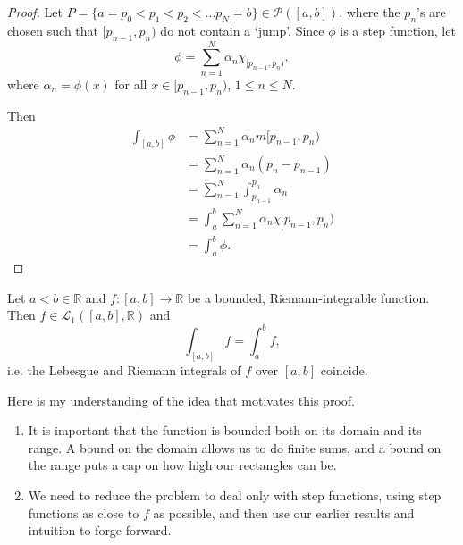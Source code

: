 \documentclass[notoc,notitlepage]{tufte-book}
\begin{document}
\begin{proof}
  Let $P = \{ a = p_0 < p_1 < p_2 < \hdots p_N = b \} \in \mathcal{P}([a, b])$,
  where the $p_n$'s are chosen such that $[p_{n-1}, p_n)$ do not contain a
  `jump'. Since $\phi$ is a step function, let
  \begin{equation*}
    \phi = \sum_{n=1}^{N} \alpha_n \chi_{[p_{n-1}, p_n)},
  \end{equation*}
  where $\alpha_n = \phi(x)$ for all $x \in [p_{n-1}, p_n)$, $1 \leq n \leq N$.

  Then
  \begin{align*}
    \int_{[a, b]} \phi
    &= \sum_{n=1}^{N} \alpha_n m[p_{n-1}, p_n) \\
    &= \sum_{n=1}^{N} \alpha_n (p_n - p_{n-1}) \\
    &= \sum_{n=1}^{N} \int_{p_{n-1}}^{p_n} \alpha_n \\
    &= \int_{a}^{b} \sum_{n=1}^{N} \alpha_n \chi_[p_{n-1}, p_n) \\
    &= \int_{a}^{b} \phi.
  \end{align*}
\end{proof}

\begin{thm}\label{thm:bounded_riemann_integrable_functions_are_lebesgue_integrable}
  Let $a < b \in \mathbb{R}$ and $f : [a, b] \to \mathbb{R}$ be a bounded,
  Riemann-integrable function. Then $f \in \mathcal{L}_1([a, b], \mathbb{R})$ 
  and
  \begin{equation*}
    \int_{[a, b]} f = \int_{a}^{b} f,
  \end{equation*}
  i.e. the Lebesgue and Riemann integrals of $f$ over $[a, b]$ coincide.
\end{thm}

\begin{strategy}
  Here is my understanding of the idea that motivates this proof.
  \begin{enumerate}
    \item It is important that the function is bounded both on its domain and
      its range. A bound on the domain allows us to do finite sums, and a bound
      on the range puts a cap on how high our rectangles can be.
    \item We need to reduce the problem to deal only with step functions, using
      step functions as close to $f$ as possible, and then use our earlier
      results and intuition to forge forward.
  \end{enumerate}
\end{strategy}
\end{document}
